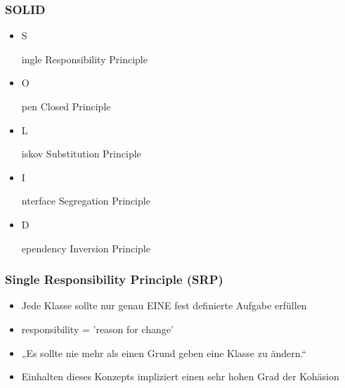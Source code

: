 \begin{frame}[fragile]
	\frametitle{SOLID}
		\begin{itemize}
		  \item \begin{emph}S~\end{emph}ingle Responsibility Principle
		  \item \begin{emph}O~\end{emph}pen Closed Principle
		  \item \begin{emph}L~\end{emph}iskov Substitution Principle
		  \item \begin{emph}I~\end{emph}nterface Segregation Principle
		  \item \begin{emph}D~\end{emph}ependency Inversion Principle
		\end{itemize}
\end{frame} 

\begin{frame}[fragile]
	\frametitle{Single Responsibility Principle (SRP)}
	\begin{itemize}
		\item Jede Klasse sollte nur genau EINE fest definierte Aufgabe 
		erf\"ullen
		\item responsibility = 'reason for change'
		\item „Es sollte nie mehr als einen Grund geben eine Klasse zu ändern.“
		\item Einhalten dieses Konzepts impliziert einen sehr hohen Grad der
		Koh\"asion
	\end{itemize}
\end{frame} 

